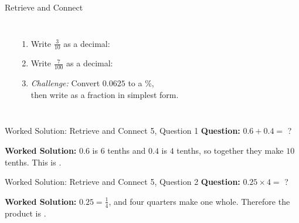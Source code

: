 \documentclass{beamer}
\newcommand{\ablank}[1]{%
  \alt<2>{\textcolor{red}{#1}}{\underline{\phantom{#1}}}%
}
\newcommand{\ashow}[1]{\uncover<2->{\textcolor{red}{\small #1}}}
\begin{document}
\begin{frame}[t]{Retrieve and Connect}
\begin{columns}
\begin{center}
\end{center}

\begin{enumerate}
  \item Write $\frac{3}{10}$ as a decimal: \ablank{$0.3$}
  \item Write $\frac{7}{100}$ as a decimal: \ablank{$0.07$}
  \item \textit{Challenge:} Convert $0.0625$ to a \%,\\
        then write as a fraction in simplest form.
        \ashow{$6.25\%=\tfrac{1}{16}$}
\end{enumerate}
\end{columns}
\end{frame}

\begin{frame}[t]{Worked Solution: Retrieve and Connect 5, Question 1}
\hypertarget{work-st5}{}
\textbf{Question:} \(0.6 + 0.4 =\) ?

\smallskip
\textbf{Worked Solution:} \(0.6\) is \(6\) tenths and \(0.4\) is \(4\) tenths, so together they make \(10\) tenths. This is \ablank{$1$}.
\end{frame}

\begin{frame}[t]{Worked Solution: Retrieve and Connect 5, Question 2}
\textbf{Question:} \(0.25 \times 4 =\) ?

\smallskip
\textbf{Worked Solution:} \(0.25 = \frac{1}{4}\), and four quarters make one whole. Therefore the product is \ablank{$1$}.
\end{frame}
\end{document}
